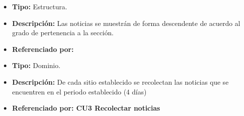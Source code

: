 
\begin{itemize}
  \item \textbf{Tipo:} Estructura.
  \item \textbf{Descripción:} Las noticias se muestrán de forma descendente de acuerdo al grado de pertenencia
    a la sección.
  \item \textbf{Referenciado por:}  \\
\end{itemize}


\begin{itemize}
  \item \textbf{Tipo:} Dominio.
  \item \textbf{Descripción:} De cada sitio establecido se recolectan las noticias que se encuentren en el periodo 
    establecido (4 días)

  \item \textbf{Referenciado por: CU3 Recolectar noticias} \\
\end{itemize}
